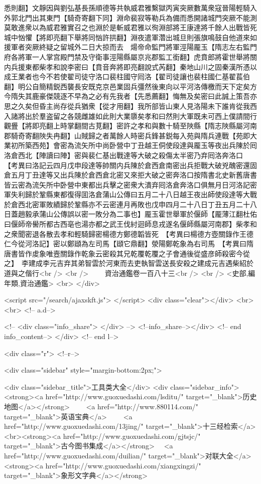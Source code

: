 悉則翻】文靜因與劉弘基長孫順德等共執威君雅繫獄丙寅突厥數萬衆寇晉陽輕騎入外郭北門出其東門【騎奇寄翻下同】淵命裴寂等勒兵為備而悉開諸城門突厥不能測莫敢進衆以為威君雅實召之也淵於是斬威君雅以徇淵部將王康達將千餘人出戰皆死城中忷懼【將即亮翻下舉將同忷許拱翻】淵夜遣軍濳出城旦則張旗鳴鼓自他道來如援軍者突厥終疑之留城外二日大掠而去　煬帝命監門將軍涇陽龎玉【隋志左右監門府各將軍一人掌宫殿門禁及守衛事涇陽縣屬京兆郡監工銜翻】虎賁郎將霍世舉將關内兵援東都柴孝和說李密曰【賁音奔將即亮翻說式芮翻】秦地山川之固秦漢所憑以成王業者也今不若使翟司徒守洛口裴柱國守囘洛【翟司徒讓也裴柱國仁基翟萇伯翻】明公自簡精鋭西襲長安既克京邑業固兵彊然後東向以平河洛傳檄而天下定矣方今隋失其鹿豪傑競逐不早為之必有先我者【先悉薦翻】悔無及矣密曰此誠上策吾亦思之久矣但昏主尚存從兵猶衆【從才用翻】我所部皆山東人見洛陽未下誰肯從我西入諸將出於羣盗留之各競雌雄如此則大業隳矣孝和曰然則大軍既未可西上僕請間行觀舋【將即亮翻上時掌翻間古莧翻】密許之孝和與數十騎至陜縣【隋志陜縣屬河南郡騎奇寄翻陜失冉翻】山賊歸之者萬餘人時密兵鋒甚鋭每入苑與隋兵連戰【苑即大業初所築西苑】會密為流矢所中尚卧營中丁丑越王侗使段達與龎玉等夜出兵陳於囘洛倉西北【陣讀曰陣】密與裴仁基出戰達等大破之殺傷太半密乃弃囘洛奔洛口　【考異曰洛記云四月戊申段達等帥關内兵陳於倉西倉南密出兵拒戰大破兇醜密還固倉五月丁丑達等又出兵陳於倉西倉北密又來拒大破之密奔洛口按隋書北史新舊唐書皆云密為流矢所中卧營中東都出兵擊之密衆大潰弃囘洛倉奔洛口俱無月日河洛記密軍失利歸於鞏縣東都復得囬洛倉蒲山公傳曰五月二十八日越王夜出師使段達等大戰於倉西北密軍敗績歸於鞏縣亦不云密連月再敗也戊申四月二十八日丁丑五月二十八日蓋趙毅承蒲山公傳誤以密一敗分為二事也】龎玉霍世舉軍於偃師【龎薄江翻杜佑曰偃師帝嚳所都古西亳也湯亦都之武王伐紂迴師息戎遂名偃師縣屬河南郡】柴孝和之衆聞密退各散去孝和輕騎歸密楊德方鄭德韜皆死　【考異曰楊德方壺關錄作王德仁今從河洛記】密以鄭頲為左司馬【頲它鼎翻】滎陽鄭乾象為右司馬　【考異曰隋唐書皆作䖍象唯壼關錄作乾象云密殺其兄乾覆乾覆之子會通後從盛彦師殺密今從之】　李建成李元吉弃其弟智雲於河東而去吏執智雲送長安殺之建成元吉遇柴紹於道與之偕行<br />
<br />
　　資治通鑑卷一百八十三<br />
<br />
<史部,編年類,資治通鑑>  <br>
   </div> 

<script src="/search/ajaxskft.js"> </script>
 <div class="clear"></div>
<br>
<br>
 <!-- a.d-->

 <!--
<div class="info_share">
</div> 
-->
 <!--info_share--></div>   <!-- end info_content-->
  </div> <!-- end l-->

<div class="r">   <!--r-->



<div class="sidebar"  style="margin-bottom:2px;">

 
<div class="sidebar_title">工具类大全</div>
<div class="sidebar_info">
<strong><a href="http://www.guoxuedashi.com/lsditu/" target="_blank">历史地图</a></strong>　　
<a href="http://www.880114.com/" target="_blank">英语宝典</a>　　
<a href="http://www.guoxuedashi.com/13jing/" target="_blank">十三经检索</a>　
<br><strong><a href="http://www.guoxuedashi.com/gjtsjc/" target="_blank">古今图书集成</a></strong>　
<a href="http://www.guoxuedashi.com/duilian/" target="_blank">对联大全</a>　<strong><a href="http://www.guoxuedashi.com/xiangxingzi/" target="_blank">象形文字典</a></strong>　

